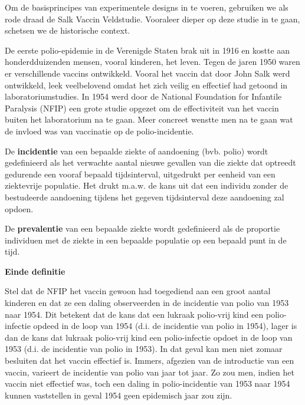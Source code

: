 \documentclass[12pt,dutch,coursenotes]{book}
\theoremstyle{definition}
\theoremstyle{definition}
\theoremstyle{definition}
\theoremstyle{remark}
\let\BeginKnitrBlock\begin \let\EndKnitrBlock\end
\begin{document}
Om de basisprincipes van experimentele designs in te voeren, gebruiken
we als rode draad de Salk Vaccin Veldstudie. Vooraleer dieper op deze
studie in te gaan, schetsen we de historische context.

De eerste polio-epidemie in de Verenigde Staten brak uit in 1916 en
kostte aan honderdduizenden mensen, vooral kinderen, het leven. Tegen de
jaren 1950 waren er verschillende vaccins ontwikkeld. Vooral het vaccin
dat door John Salk werd ontwikkeld, leek veelbelovend omdat het zich
veilig en effectief had getoond in laboratoriumstudies. In 1954 werd
door de National Foundation for Infantile Paralysis (NFIP) een grote
studie opgezet om de effectiviteit van het vaccin buiten het
laboratorium na te gaan. Meer concreet wenstte men na te gaan wat de
invloed was van vaccinatie op de polio-incidentie.

\BeginKnitrBlock{definition}[incidentie en prevalentie]
\protect\hypertarget{def:unnamed-chunk-11}{}{\label{def:unnamed-chunk-11}
\iffalse (incidentie en prevalentie) \fi{} }De \textbf{incidentie} van
een bepaalde ziekte of aandoening (bvb. polio) wordt gedefinieerd als
het verwachte aantal nieuwe gevallen van die ziekte dat optreedt
gedurende een vooraf bepaald tijdsinterval, uitgedrukt per eenheid van
een ziektevrije populatie. Het drukt m.a.w. de kans uit dat een individu
zonder de bestudeerde aandoening tijdens het gegeven tijdsinterval deze
aandoening zal opdoen.

De \textbf{prevalentie} van een bepaalde ziekte wordt gedefinieerd als
de proportie individuen met de ziekte in een bepaalde populatie op een
bepaald punt in de tijd.

\textbf{Einde definitie}
\EndKnitrBlock{definition}

Stel dat de NFIP het vaccin gewoon had toegediend aan een groot aantal
kinderen en dat ze een daling observeerden in de incidentie van polio
van 1953 naar 1954. Dit betekent dat de kans dat een lukraak polio-vrij
kind een polio-infectie opdeed in de loop van 1954 (d.i. de incidentie
van polio in 1954), lager is dan de kans dat lukraak polio-vrij kind een
polio-infectie opdoet in de loop van 1953 (d.i. de incidentie van polio
in 1953). In dat geval kan men niet zomaar besluiten dat het vaccin
effectief is. Immers, afgezien van de introductie van een vaccin,
varieert de incidentie van polio van jaar tot jaar. Zo zou men, indien
het vaccin niet effectief was, toch een daling in polio-incidentie van
1953 naar 1954 kunnen vaststellen in geval 1954 geen epidemisch jaar zou
zijn.
\end{document}
